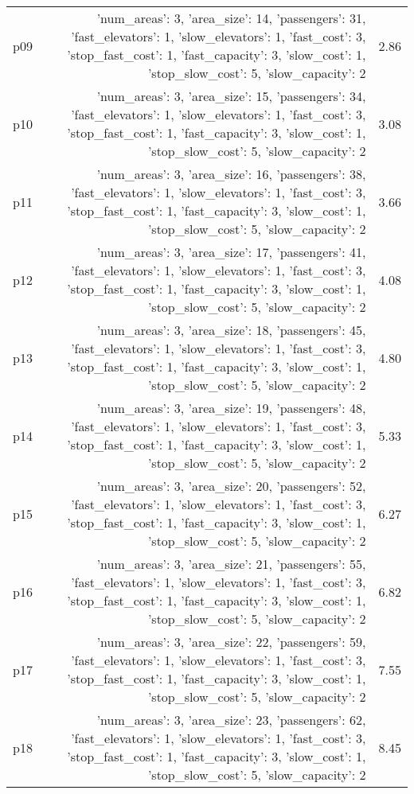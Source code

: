 \documentclass{article}
\begin{document}
\begin{center}
\begin{tabular}{@{}l|r|r@{}}
  p09&{'num\_areas': 3, 'area\_size': 14, 'passengers': 31, 'fast\_elevators': 1, 'slow\_elevators': 1, 'fast\_cost': 3, 'stop\_fast\_cost': 1, 'fast\_capacity': 3, 'slow\_cost': 1, 'stop\_slow\_cost': 5, 'slow\_capacity': 2}&2.86\\
  p10&{'num\_areas': 3, 'area\_size': 15, 'passengers': 34, 'fast\_elevators': 1, 'slow\_elevators': 1, 'fast\_cost': 3, 'stop\_fast\_cost': 1, 'fast\_capacity': 3, 'slow\_cost': 1, 'stop\_slow\_cost': 5, 'slow\_capacity': 2}&3.08\\
  p11&{'num\_areas': 3, 'area\_size': 16, 'passengers': 38, 'fast\_elevators': 1, 'slow\_elevators': 1, 'fast\_cost': 3, 'stop\_fast\_cost': 1, 'fast\_capacity': 3, 'slow\_cost': 1, 'stop\_slow\_cost': 5, 'slow\_capacity': 2}&3.66\\
  p12&{'num\_areas': 3, 'area\_size': 17, 'passengers': 41, 'fast\_elevators': 1, 'slow\_elevators': 1, 'fast\_cost': 3, 'stop\_fast\_cost': 1, 'fast\_capacity': 3, 'slow\_cost': 1, 'stop\_slow\_cost': 5, 'slow\_capacity': 2}&4.08\\
  p13&{'num\_areas': 3, 'area\_size': 18, 'passengers': 45, 'fast\_elevators': 1, 'slow\_elevators': 1, 'fast\_cost': 3, 'stop\_fast\_cost': 1, 'fast\_capacity': 3, 'slow\_cost': 1, 'stop\_slow\_cost': 5, 'slow\_capacity': 2}&4.80\\
  p14&{'num\_areas': 3, 'area\_size': 19, 'passengers': 48, 'fast\_elevators': 1, 'slow\_elevators': 1, 'fast\_cost': 3, 'stop\_fast\_cost': 1, 'fast\_capacity': 3, 'slow\_cost': 1, 'stop\_slow\_cost': 5, 'slow\_capacity': 2}&5.33\\
  p15&{'num\_areas': 3, 'area\_size': 20, 'passengers': 52, 'fast\_elevators': 1, 'slow\_elevators': 1, 'fast\_cost': 3, 'stop\_fast\_cost': 1, 'fast\_capacity': 3, 'slow\_cost': 1, 'stop\_slow\_cost': 5, 'slow\_capacity': 2}&6.27\\
  p16&{'num\_areas': 3, 'area\_size': 21, 'passengers': 55, 'fast\_elevators': 1, 'slow\_elevators': 1, 'fast\_cost': 3, 'stop\_fast\_cost': 1, 'fast\_capacity': 3, 'slow\_cost': 1, 'stop\_slow\_cost': 5, 'slow\_capacity': 2}&6.82\\
  p17&{'num\_areas': 3, 'area\_size': 22, 'passengers': 59, 'fast\_elevators': 1, 'slow\_elevators': 1, 'fast\_cost': 3, 'stop\_fast\_cost': 1, 'fast\_capacity': 3, 'slow\_cost': 1, 'stop\_slow\_cost': 5, 'slow\_capacity': 2}&7.55\\
  p18&{'num\_areas': 3, 'area\_size': 23, 'passengers': 62, 'fast\_elevators': 1, 'slow\_elevators': 1, 'fast\_cost': 3, 'stop\_fast\_cost': 1, 'fast\_capacity': 3, 'slow\_cost': 1, 'stop\_slow\_cost': 5, 'slow\_capacity': 2}&8.45\\

\end{tabular}
\end{center}
\end{document}
